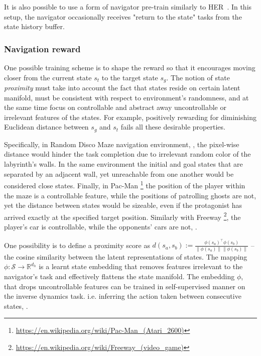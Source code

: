 \documentclass[acmsmall, nonacm]{acmart}
\begin{document}
It is also possible to use a form of navigator pre-train similarly to HER~\citep{andrychowicz_hindsight_2017}. In this setup, the navigator occasionally receives "return to the state" tasks from the state history buffer.

\subsubsection{Navigation reward}
\label{ssub:navigation_reward}

One possible training scheme is to shape the reward so that it encourages moving closer from the current state $s_t$ to the target state $s_g$. The notion of state \emph{proximity} must take into account the fact that states reside on certain latent manifold, must be consistent with respect to environment's randomness, and at the same time focus on controllable and abstract away uncontrollable or irrelevant features of the states. For example, positively rewarding for diminishing Euclidean distance between $s_g$ and $s_t$ fails all these desirable properties.

Specifically, in Random Disco Maze navigation environment, \citep{badia_never_2020}, the pixel-wise distance would hinder the task completion due to irrelevant random color of the labyrinth's walls. In the same environment the initial and goal states that are separated by an adjacent wall, yet unreachable from one another would be considered close states. Finally, in Pac-Man%
\footnote{
    \url{https://en.wikipedia.org/wiki/Pac-Man_(Atari_2600)}
}
the position of the player within the maze is a controllable feature, while the positions of patrolling ghosts are not, yet the distance between states would be sizeable, even if the protagonist has arrived exactly at the specified target position.
%
Similarly with Freeway%
\footnote{
    \url{https://en.wikipedia.org/wiki/Freeway_(video_game)}
}, the player's car is controllable, while the opponents' cars are not, \citep[fig.~1]{choi_contingency-aware_2019}.


One possibility is to define a proximity score as $
    d(s_a, s_b) 
        := \frac{\phi(s_a)^\top \phi(s_b)}{\|\phi(s_a)\|\|\phi(s_b)\|}
$ -- the cosine similarity between the latent representations of states. The mapping $
    \phi \colon \mathcal{S} \to \mathbb{R}^{d_h}
$ is a learnt state embedding that removes features irrelevant to the navigator's task and effectively flattens the state manifold. The embedding $\phi$, that drops uncontrollable features can be trained in self-supervised manner on the inverse dynamics task. i.e. inferring the action taken between consecutive states, \citep{choi_contingency-aware_2019,badia_never_2020}.
\end{document}
